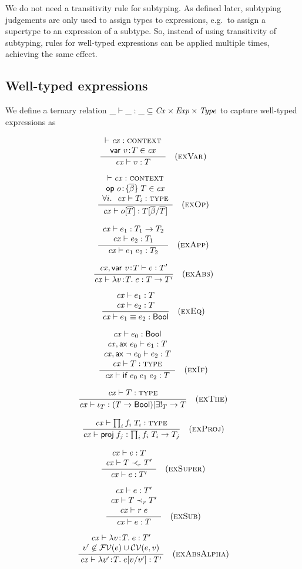 We do not need a transitivity rule for subtyping. As defined later, subtyping
judgements are only used to assign types to expressions, e.g.\ to assign a
supertype to an expression of a subtype. So, instead of using transitivity of
subtyping, rules for well-typed expressions can be applied multiple times,
achieving the same effect.

\subsection{Well-typed expressions}

We define a ternary relation $\_\vdash\_:\_\subseteq\mathit{Cx}\times\mathit{Exp}\times\mathit{Type}$ to capture
well-typed expressions as

\[
\frac{\begin{array}{c}\vdash\mathit{cx}:\textsc{context}\\\mathsf{var}\ v\!:\!T\in\mathit{cx}\end{array}}{\mathit{cx}\vdash v:T}\quad\mbox{(\textsc{exVar})}
\]

\[
\frac{\begin{array}{c}\vdash\mathit{cx}:\textsc{context}\\\mathsf{op}\ o\!:\!\{\overline{\beta}\}\;T\in\mathit{cx}\\\forall i.\ \ \mathit{cx}\vdash T_i:\textsc{type}\end{array}}{\mathit{cx}\vdash o[\overline{T}]:T[\overline{\beta}/\overline{T}]}\quad\mbox{(\textsc{exOp})}
\]

\[
\frac{\begin{array}{c}\mathit{cx}\vdash e_1:T_1\to T_2\\\mathit{cx}\vdash e_2:T_1\end{array}}{\mathit{cx}\vdash e_1\;e_2:T_2}\quad\mbox{(\textsc{exApp})}
\]

\[
\frac{\begin{array}{c}\mathit{cx},\mathsf{var}\ v\!:\!T\vdash e:T'\end{array}}{\mathit{cx}\vdash\lambda v\!:\!T.\;e:T\to T'}\quad\mbox{(\textsc{exAbs})}
\]

\[
\frac{\begin{array}{c}\mathit{cx}\vdash e_1:T\\\mathit{cx}\vdash e_2:T\end{array}}{\mathit{cx}\vdash e_1\equiv e_2:\mathsf{Bool}}\quad\mbox{(\textsc{exEq})}
\]

\[
\frac{\begin{array}{c}\mathit{cx}\vdash e_0:\mathsf{Bool}\\\mathit{cx},\mathsf{ax}\ e_0\vdash e_1:T\\\mathit{cx},\mathsf{ax}\ \neg\;e_0\vdash e_2:T\\\mathit{cx}\vdash T:\textsc{type}\end{array}}{\mathit{cx}\vdash\mathsf{if}\;e_0\;e_1\;e_2:T}\quad\mbox{(\textsc{exIf})}
\]

\[
\frac{\begin{array}{c}\mathit{cx}\vdash T:\textsc{type}\end{array}}{\mathit{cx}\vdash\iota_{T}:(T\to\mathsf{Bool})|\exists!_{T}\to T}\quad\mbox{(\textsc{exThe})}
\]

\[
\frac{\begin{array}{c}\mathit{cx}\vdash\prod_{i}f_i\;T_i:\textsc{type}\end{array}}{\mathit{cx}\vdash\mathsf{proj}\;{f_j}:\prod_{i}f_i\;T_i\to T_j}\quad\mbox{(\textsc{exProj})}
\]

\[
\frac{\begin{array}{c}\mathit{cx}\vdash e:T\\\mathit{cx}\vdash T\prec_{r}T'\end{array}}{\mathit{cx}\vdash e:T'}\quad\mbox{(\textsc{exSuper})}
\]

\[
\frac{\begin{array}{c}\mathit{cx}\vdash e:T'\\\mathit{cx}\vdash T\prec_{r}T'\\\mathit{cx}\vdash r\;e\end{array}}{\mathit{cx}\vdash e:T}\quad\mbox{(\textsc{exSub})}
\]

\[
\frac{\begin{array}{c}\mathit{cx}\vdash\lambda v\!:\!T.\;e:T'\\v'\not\in\mathcal{FV}(e)\cup\mathcal{CV}(e,v)\end{array}}{\mathit{cx}\vdash\lambda v'\!:\!T.\;e[v/v']:T'}\quad\mbox{(\textsc{exAbsAlpha})}
\]

